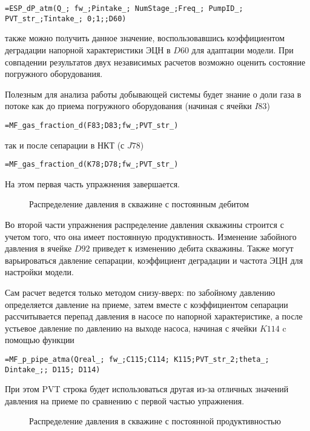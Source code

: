 { \small  \texttt{=ESP\_dP\_atm(Q\_; fw\_;Pintake\_; NumStage\_;Freq\_; PumpID\_; PVT\_str\_;Tintake\_; 0;1;;D60)
}}

также можно получить данное значение, воспользовавшись коэффициентом деградации напорной характеристики ЭЦН в $D60$ для адаптации модели. При совпадении результатов двух независимых расчетов возможно оценить состояние погружного оборудования.

Полезным для анализа работы добывающей системы будет знание о доли газа в потоке как до приема погружного оборудования (начиная с ячейки $I83$)

{ \small  \texttt{=MF\_gas\_fraction\_d(F83;D83;fw\_;PVT\_str\_)
}}

так и после сепарации в НКТ (с $J78$)

{ \small  \texttt{=MF\_gas\_fraction\_d(K78;D78;fw\_;PVT\_str\_)
}}

На этом первая часть упражнения завершается.

\begin{figure}[h!]
	\center{\texttt{[image: Ex100\_2]}}
	\caption{Распределение давления в скважине с постоянным дебитом}
	\label{ris:Ex100_2}
\end{figure}

Во второй части упражнения распределение давления скважины строится с учетом того, что она имеет постоянную продуктивность. Изменение забойного давления в ячейке $D92$ приведет к изменению дебита скважины. Также могут варьироваться давление сепарации, коэффициент деградации и частота ЭЦН для настройки модели.

Сам расчет ведется только методом снизу-вверх: по забойному давлению определяется давление на приеме, затем вместе с коэффициентом сепарации рассчитывается перепад давления в насосе по напорной характеристике, а после устьевое давление по давлению на выходе насоса, начиная с ячейки $K114$ c помощью функции

{ \small  \texttt{=MF\_p\_pipe\_atma(Qreal\_; fw\_;C115;C114; K115;PVT\_str\_2;theta\_; Dintake\_;; D115; D114)
}}

При этом PVT строка будет использоваться другая из-за отличных значений давления на приеме по сравнению с первой частью упражнения.

\begin{figure}[h!]
	\center{\texttt{[image: Ex100\_3]}}
	\caption{Распределение давления в скважине с постоянной продуктивностью}
	\label{ris:Ex100_3}
\end{figure}

